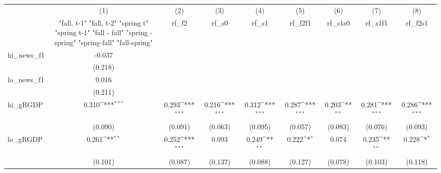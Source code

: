 {
\def\sym#1{\ifmmode^{#1}\else\(^{#1}\)\fi}
\begin{tabular}{l*{8}{c}}
\toprule
            &\multicolumn{1}{c}{(1)}&\multicolumn{1}{c}{(2)}&\multicolumn{1}{c}{(3)}&\multicolumn{1}{c}{(4)}&\multicolumn{1}{c}{(5)}&\multicolumn{1}{c}{(6)}&\multicolumn{1}{c}{(7)}&\multicolumn{1}{c}{(8)}\\
            &\multicolumn{1}{c}{  "fall, t-1" "fall, t-2" "spring t" "spring t-1"  "fall - fall" "spring - spring" "spring-fall" "fall-spring" }&\multicolumn{1}{c}{rf\_f2}&\multicolumn{1}{c}{rf\_s0}&\multicolumn{1}{c}{rf\_s1}&\multicolumn{1}{c}{rf\_f2f1}&\multicolumn{1}{c}{rf\_s1s0}&\multicolumn{1}{c}{rf\_s1f1}&\multicolumn{1}{c}{rf\_f2s1}\\
\midrule
hi\_news\_f1  &      -0.037         &                     &                     &                     &                     &                     &                     &                     \\
            &     (0.218)         &                     &                     &                     &                     &                     &                     &                     \\
\addlinespace
lo\_news\_f1  &       0.016         &                     &                     &                     &                     &                     &                     &                     \\
            &     (0.211)         &                     &                     &                     &                     &                     &                     &                     \\
\addlinespace
hi\_gRGDP    &       0.310\sym{***}&       0.293\sym{***}&       0.216\sym{***}&       0.312\sym{***}&       0.287\sym{***}&       0.203\sym{**} &       0.281\sym{***}&       0.286\sym{***}\\
            &     (0.090)         &     (0.091)         &     (0.063)         &     (0.095)         &     (0.057)         &     (0.083)         &     (0.076)         &     (0.093)         \\
\addlinespace
lo\_gRGDP    &       0.261\sym{**} &       0.252\sym{***}&       0.093         &       0.249\sym{**} &       0.222\sym{*}  &       0.074         &       0.235\sym{**} &       0.228\sym{*}  \\
            &     (0.101)         &     (0.087)         &     (0.137)         &     (0.088)         &     (0.127)         &     (0.078)         &     (0.103)         &     (0.118)         \\

\end{tabular}}
